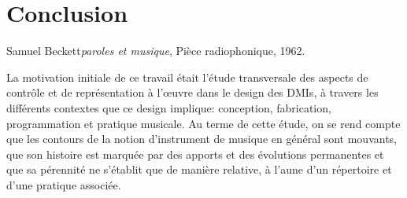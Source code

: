 %
\chapter{Conclusion}
\label{ch:conclusion}

{Samuel Beckett}{\textit{paroles et musique}, Pièce radiophonique, 1962. \cite{beckett_comeet_2014}}


\noindent La motivation initiale de ce travail était l'étude transversale des aspects de contrôle et de représentation à l'œuvre dans le design des \glspl{DMI}, à travers les différents contextes que ce design implique: conception, fabrication, programmation et pratique musicale. Au terme de cette étude, on se rend compte que les contours de la notion d'instrument de musique en général sont mouvants, que son histoire est marquée par des apports et des évolutions permanentes et que sa pérennité ne s'établit que de manière relative, à l'aune d'un répertoire et d'une pratique associée.

